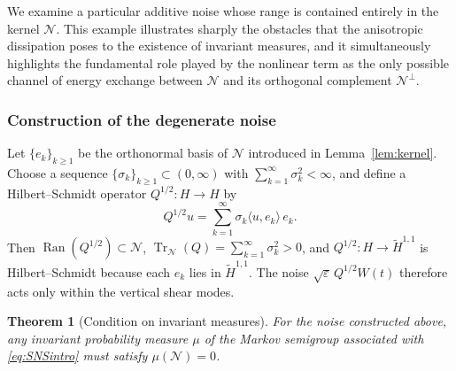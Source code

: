 \documentclass[11pt,a4paper,reqno]{amsart}
\newtheorem{theorem}{Theorem}[section]
\theoremstyle{definition}
\begin{document}
We examine a particular additive noise whose range is contained entirely in the kernel
$\mathcal N$.  This example illustrates sharply
the obstacles that the anisotropic dissipation poses to the existence of invariant
measures, and it simultaneously highlights the fundamental role played by the
nonlinear term as the only possible channel of energy exchange between $\mathcal N$
and its orthogonal complement $\mathcal N^\perp$.

\subsubsection*{Construction of the degenerate noise}
Let $\{e_k\}_{k\ge 1}$ be the orthonormal basis of $\mathcal N$ introduced in
Lemma~\ref{lem:kernel}.  Choose a sequence $\{\sigma_k\}_{k\ge 1}\subset(0,\infty)$
with $\sum_{k=1}^{\infty}\sigma_k^2<\infty$, and define a Hilbert--Schmidt operator
$Q^{1/2}:H\to H$ by
\[
  Q^{1/2} u = \sum_{k=1}^{\infty} \sigma_k \langle u, e_k\rangle\, e_k .
\]
Then $\operatorname{Ran}(Q^{1/2})\subset\mathcal N$,
$\operatorname{Tr}_{\mathcal N}(Q)=\sum_{k=1}^{\infty}\sigma_k^2>0$, and
$Q^{1/2}:H\to\widetilde H^{1,1}$ is Hilbert--Schmidt because each $e_k$ lies in
$\widetilde H^{1,1}$.  The noise $\sqrt\varepsilon\,Q^{1/2}W(t)$ therefore acts
only within the vertical shear modes.

\begin{theorem}[Condition on invariant measures]\label{th:degen}
  For the noise constructed above, any invariant probability measure $\mu$ of the
  Markov semigroup associated with \eqref{eq:SNSintro} must satisfy
  $\mu(\mathcal N)=0$.
\end{theorem}
\end{document}

